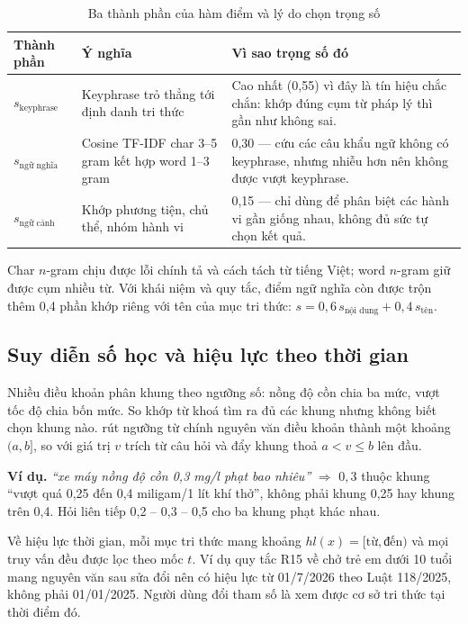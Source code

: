 \begin{table}[H]
\centering
\caption{Ba thành phần của hàm điểm và lý do chọn trọng số}
\label{tab:score}
\renewcommand{\arraystretch}{1.25}
\begin{tabularx}{\textwidth}{@{}>{\raggedright\arraybackslash}p{2.6cm} >{\raggedright\arraybackslash}p{5.0cm} L@{}}
\toprule
\textbf{Thành phần} & \textbf{Ý nghĩa} & \textbf{Vì sao trọng số đó} \\
\midrule
$s_{\text{keyphrase}}$ & Keyphrase trỏ thẳng tới định danh tri thức & Cao nhất (0,55) vì đây là tín hiệu chắc chắn: khớp đúng cụm từ pháp lý thì gần như không sai. \\
$s_{\text{ngữ nghĩa}}$ & Cosine TF-IDF char 3--5 gram kết hợp word 1--3 gram & 0,30 --- cứu các câu khẩu ngữ không có keyphrase, nhưng nhiễu hơn nên không được vượt keyphrase. \\
$s_{\text{ngữ cảnh}}$ & Khớp phương tiện, chủ thể, nhóm hành vi & 0,15 --- chỉ dùng để phân biệt các hành vi gần giống nhau, không đủ sức tự chọn kết quả. \\
\bottomrule
\end{tabularx}
\end{table}

Char $n$-gram chịu được lỗi chính tả và cách tách từ tiếng Việt; word $n$-gram giữ được cụm
nhiều từ. Với khái niệm và quy tắc, điểm ngữ nghĩa còn được trộn thêm 0,4 phần khớp riêng với
tên của mục tri thức: $s = 0{,}6\, s_{\text{nội dung}} + 0{,}4\, s_{\text{tên}}$.

\subsection{Suy diễn số học và hiệu lực theo thời gian}

Nhiều điều khoản phân khung theo ngưỡng số: nồng độ cồn chia ba mức, vượt tốc độ chia bốn
mức. So khớp từ khoá tìm ra đủ các khung nhưng không biết chọn khung nào.
 rút ngưỡng từ chính nguyên văn điều khoản thành một khoảng
$(a, b]$, so với giá trị $v$ trích từ câu hỏi và đẩy khung thoả $a < v \le b$ lên đầu.

\begin{keybox}
\textbf{Ví dụ.} \emph{``xe máy nồng độ cồn 0,3 mg/l phạt bao nhiêu''} $\Rightarrow$ $0{,}3$ thuộc
khung ``vượt quá 0,25 đến 0,4 miligam/1 lít khí thở'', không phải khung 0,25 hay khung trên
0,4. Hỏi liên tiếp 0,2 -- 0,3 -- 0,5 cho ba khung phạt khác nhau.
\end{keybox}

Về hiệu lực thời gian, mỗi mục tri thức mang khoảng $hl(x) = [\text{từ}, \text{đến})$ và mọi
truy vấn đều được lọc theo mốc $t$. Ví dụ quy tắc R15 về chở trẻ em dưới 10 tuổi mang nguyên
văn sau sửa đổi nên có hiệu lực từ 01/7/2026 theo Luật 118/2025, không phải 01/01/2025. Người
dùng đổi tham số  là xem được cơ sở tri thức tại thời điểm đó.

